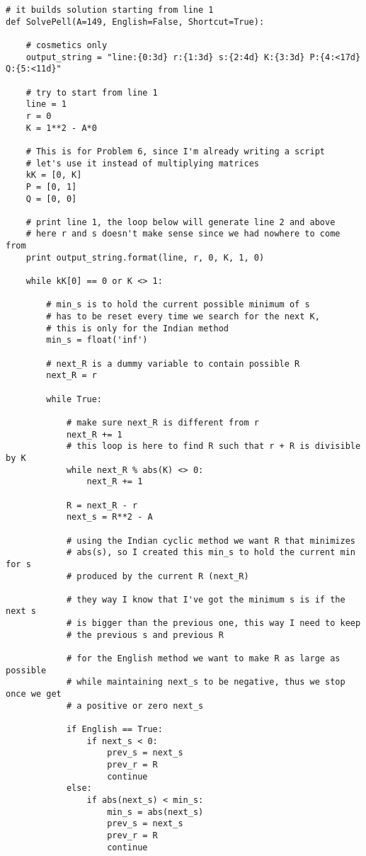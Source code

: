 \documentclass[aps,preprint,preprintnumbers,nofootinbib,showpacs,prd]{revtex4-1}
\begin{document}
\begin{Verbatim}[baselinestretch=0.75]
# it builds solution starting from line 1
def SolvePell(A=149, English=False, Shortcut=True):

    # cosmetics only
    output_string = "line:{0:3d} r:{1:3d} s:{2:4d} K:{3:3d} P:{4:<17d} Q:{5:<11d}"

    # try to start from line 1
    line = 1
    r = 0
    K = 1**2 - A*0

    # This is for Problem 6, since I'm already writing a script
    # let's use it instead of multiplying matrices
    kK = [0, K]
    P = [0, 1]
    Q = [0, 0]

    # print line 1, the loop below will generate line 2 and above
    # here r and s doesn't make sense since we had nowhere to come from
    print output_string.format(line, r, 0, K, 1, 0)
    
    while kK[0] == 0 or K <> 1:
        
        # min_s is to hold the current possible minimum of s
        # has to be reset every time we search for the next K,
        # this is only for the Indian method
        min_s = float('inf')
        
        # next_R is a dummy variable to contain possible R
        next_R = r
        
        while True:

            # make sure next_R is different from r
            next_R += 1
            # this loop is here to find R such that r + R is divisible by K
            while next_R % abs(K) <> 0:
                next_R += 1

            R = next_R - r
            next_s = R**2 - A

            # using the Indian cyclic method we want R that minimizes
            # abs(s), so I created this min_s to hold the current min for s
            # produced by the current R (next_R)

            # they way I know that I've got the minimum s is if the next s
            # is bigger than the previous one, this way I need to keep
            # the previous s and previous R

            # for the English method we want to make R as large as possible
            # while maintaining next_s to be negative, thus we stop once we get
            # a positive or zero next_s

            if English == True:
                if next_s < 0:
                    prev_s = next_s
                    prev_r = R
                    continue
            else:               
                if abs(next_s) < min_s:
                    min_s = abs(next_s)
                    prev_s = next_s
                    prev_r = R
                    continue


\end{Verbatim}
\end{document}

